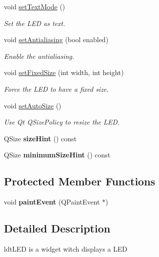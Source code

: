 \begin{DoxyCompactItemize}
void \hyperlink{classmdt_led_a6aabb78ea686814f316f88e20d024d39}{setTextMode} ()
\begin{DoxyCompactList}\small\item\em Set the LED as text. \end{DoxyCompactList}\item 
void \hyperlink{classmdt_led_ab8a997e610a2ad5572e1a6dbe7fbc256}{setAntialiasing} (bool enabled)
\begin{DoxyCompactList}\small\item\em Enable the antialiasing. \end{DoxyCompactList}\item 
void \hyperlink{classmdt_led_abd0fde0ce1eca75fe7c832557829089b}{setFixedSize} (int width, int height)
\begin{DoxyCompactList}\small\item\em Force the LED to have a fixed size. \end{DoxyCompactList}\item 
void \hyperlink{classmdt_led_a696570e6eb8f5b0a629fc6823ed2fe4d}{setAutoSize} ()
\begin{DoxyCompactList}\small\item\em Use Qt QSizePolicy to resize the LED. \end{DoxyCompactList}\item 
\hypertarget{classmdt_led_a44cf6e19e2640bc843d1ed096843e686}{
QSize {\bfseries sizeHint} () const }
\label{classmdt_led_a44cf6e19e2640bc843d1ed096843e686}

\item 
\hypertarget{classmdt_led_ae7d22257f19d57771299b321a8a17c50}{
QSize {\bfseries minimumSizeHint} () const }
\label{classmdt_led_ae7d22257f19d57771299b321a8a17c50}

\end{DoxyCompactItemize}
\subsection*{Protected Member Functions}
\begin{DoxyCompactItemize}
\item 
\hypertarget{classmdt_led_a1c96c8e06658ba569f7cf6b3fc3f5903}{
void {\bfseries paintEvent} (QPaintEvent $\ast$)}
\label{classmdt_led_a1c96c8e06658ba569f7cf6b3fc3f5903}

\end{DoxyCompactItemize}


\subsection{Detailed Description}
ldtLED is a widget witch displays a LED 




